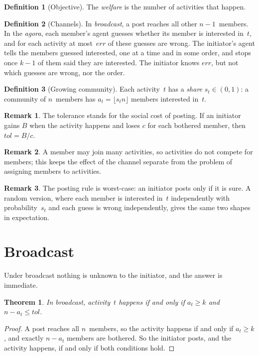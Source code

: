 \documentclass[11pt]{article}
\newtheorem{theorem}{Theorem}
\theoremstyle{definition}
\newtheorem{definition}{Definition}
\newtheorem{remark}{Remark}
\newcommand{\err}{\mathit{err}}
\newcommand{\tol}{\mathit{tol}}
\begin{document}
\begin{definition}[Objective]
The \emph{welfare} is the number of activities that happen.
\end{definition}

\begin{definition}[Channels]
In \emph{broadcast}, a post reaches all other $n-1$~members.
In the \emph{agora}, each member's agent guesses whether its member is interested in~$t$, and for each activity at most~$\err$ of these guesses are wrong. The initiator's agent tells the members guessed interested, one at a time and in some order, and stops once $k-1$ of them said they are interested. The initiator knows $\err$, but not which guesses are wrong, nor the order.
\end{definition}

\begin{definition}[Growing community]
Each activity~$t$ has a \emph{share} $s_t \in (0,1)$: a community of $n$~members has $a_t = \lfloor s_t n \rfloor$ members interested in~$t$.
\end{definition}

\begin{remark}
The tolerance stands for the social cost of posting. If an initiator gains $B$ when the activity happens and loses $c$ for each bothered member, then~$\tol = B/c$.
\end{remark}

\begin{remark}
A member may join many activities, so activities do not compete for members; this keeps the effect of the channel separate from the problem of assigning members to activities.
\end{remark}

\begin{remark}
The posting rule is worst-case: an initiator posts only if it is sure. A random version, where each member is interested in~$t$ independently with probability~$s_t$ and each guess is wrong independently, gives the same two shapes in expectation.
\end{remark}

\section{Broadcast}
Under broadcast nothing is unknown to the initiator, and the answer is immediate.

\begin{theorem}\label{thm:broadcast}
In broadcast, activity~$t$ happens if and only if $a_t \ge k$ and $n-a_t \le \tol$.
\end{theorem}
\begin{proof}
A post reaches all $n$~members, so the activity happens if and only if $a_t \ge k$, and exactly $n-a_t$ members are bothered. So the initiator posts, and the activity happens, if and only if both conditions hold.
\end{proof}
\end{document}
